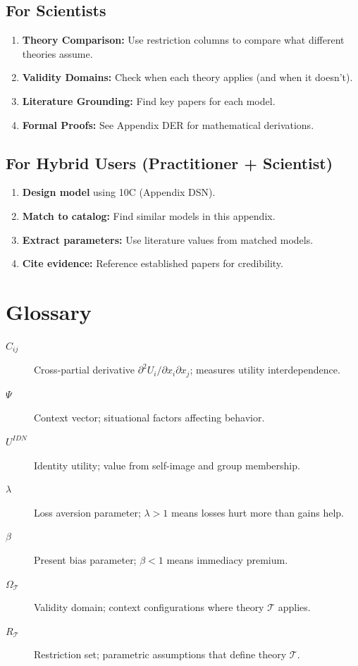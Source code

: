 \subsection{For Scientists}

\begin{enumerate}
    \item \textbf{Theory Comparison:} Use restriction columns to compare
          what different theories assume.
    \item \textbf{Validity Domains:} Check when each theory applies
          (and when it doesn't).
    \item \textbf{Literature Grounding:} Find key papers for each model.
    \item \textbf{Formal Proofs:} See Appendix DER for mathematical derivations.
\end{enumerate}

\subsection{For Hybrid Users (Practitioner + Scientist)}

\begin{enumerate}
    \item \textbf{Design model} using 10C (Appendix DSN).
    \item \textbf{Match to catalog:} Find similar models in this appendix.
    \item \textbf{Extract parameters:} Use literature values from matched models.
    \item \textbf{Cite evidence:} Reference established papers for credibility.
\end{enumerate}

\section{Glossary}
\label{sec:ms-glossary}

\begin{description}
    \item[$C_{ij}$] Cross-partial derivative $\partial^2 U_i / \partial x_i \partial x_j$;
                    measures utility interdependence.
    \item[$\Psi$] Context vector; situational factors affecting behavior.
    \item[$U^{IDN}$] Identity utility; value from self-image and group membership.
    \item[$\lambda$] Loss aversion parameter; $\lambda > 1$ means losses hurt more than gains help.
    \item[$\beta$] Present bias parameter; $\beta < 1$ means immediacy premium.
    \item[$\Omega_\mathcal{T}$] Validity domain; context configurations where theory $\mathcal{T}$ applies.
    \item[$R_\mathcal{T}$] Restriction set; parametric assumptions that define theory $\mathcal{T}$.
\end{description}

